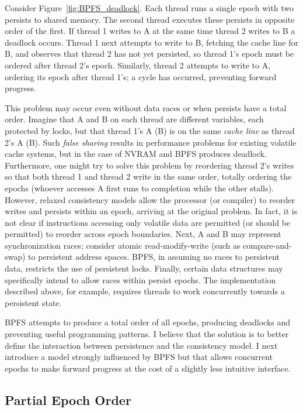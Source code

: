 Consider Figure~\ref{fig:BPFS_deadlock}.
Each thread runs a single epoch with two persists to shared memory.
The second thread executes these persists in opposite order of the first.
If thread 1 writes to A at the same time thread 2 writes to B a deadlock occurs.
Thread 1 next attempts to write to B, fetching the cache line for B, and observes that thread 2 has not yet persisted, so thread 1's epoch must be ordered after thread 2's epoch.
Similarly, thread 2 attempts to write to A, ordering its epoch after thread 1's; a cycle has occurred, preventing forward progress.

This problem may occur even without data races or when persists have a total order.
Imagine that A and B on each thread are different variables, each protected by locks, but that thread 1's A (B) is on the same \emph{cache line} as thread 2's A (B).
Such \emph{false sharing} results in performance problems for existing volatile cache systems, but in the case of NVRAM and BPFS produces deadlock.
Furthermore, one might try to solve this problem by reordering thread 2's writes so that both thread 1 and thread 2 write in the same order, totally ordering the epochs (whoever accesses A first runs to completion while the other stalls).
However, relaxed consistency models allow the processor (or compiler) to reorder writes and persists within an epoch, arriving at the original problem.
In fact, it is not clear if instructions accessing only volatile data are permitted (or should be permitted) to reorder across epoch boundaries.
Next, A and B may represent synchronization races; consider atomic read-modify-write (such as compare-and-swap) to persistent address spaces.
BPFS, in assuming no races to persistent data, restricts the use of persistent locks.
Finally, certain data structures may specifically intend to allow races within persist epochs.
The \GroupCommit implementation described above, for example, requires threads to work concurrently towards a persistent state.

BPFS attempts to produce a total order of all epochs, producing deadlocks and preventing useful programming patterns.
I believe that the solution is to better define the interaction between persistence and the consistency model.
I next introduce a model strongly influenced by BPFS but that allows concurrent epochs to make forward progress at the cost of a slightly less intuitive interface.

\subsection{Partial Epoch Order}
\label{sec:PMC:PersistenceModels:PEO}

